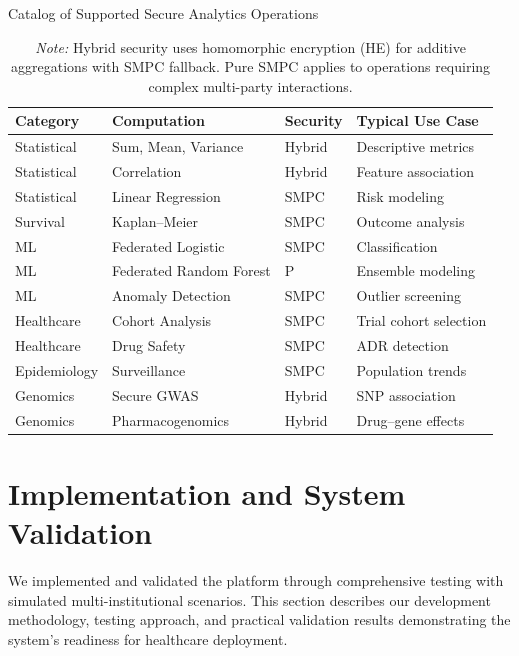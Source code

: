 \documentclass[conference]{IEEEtran}
\renewcommand{\arraystretch}{1.6} %
\begin{document}
\begin{table}[H]
\centering
\captionsetup{justification=justified,font=footnotesize}
\caption{Catalog of Supported Secure Analytics Operations}
\label{tab:catalog}
\vspace{0.3em}
\renewcommand{\arraystretch}{1.4}
\begin{adjustbox}{max width=\columnwidth}
\begin{tabular}{|l|l|l|p{3.0cm}|}
\hline
\textbf{Category} & \textbf{Computation} & \textbf{Security} & \textbf{Typical Use Case} \\
\hline
Statistical & Sum, Mean, Variance & Hybrid & Descriptive metrics \\
Statistical & Correlation & Hybrid & Feature association \\
Statistical & Linear Regression & SMPC & Risk modeling \\
Survival & Kaplan--Meier & SMPC & Outcome analysis \\
ML & Federated Logistic & SMPC & Classification \\
ML & Federated Random Forest & P & Ensemble modeling \\
ML & Anomaly Detection & SMPC & Outlier screening \\
Healthcare & Cohort Analysis & SMPC & Trial cohort selection \\
Healthcare & Drug Safety & SMPC & ADR detection \\
Epidemiology & Surveillance & SMPC & Population trends \\
Genomics & Secure GWAS & Hybrid & SNP association \\
Genomics & Pharmacogenomics & Hybrid & Drug--gene effects \\
\hline
\end{tabular}
\end{adjustbox}
\vspace{0.2em}
\captionsetup{justification=justified,font=footnotesize}
\caption*{\textit{Note:} Hybrid security uses homomorphic encryption (HE) for additive aggregations with SMPC fallback. Pure SMPC applies to operations requiring complex multi-party interactions.}
\end{table}

\section{Implementation and System Validation}
We implemented and validated the platform through comprehensive testing with simulated multi-institutional scenarios. This section describes our development methodology, testing approach, and practical validation results demonstrating the system's readiness for healthcare deployment.
\end{document}
